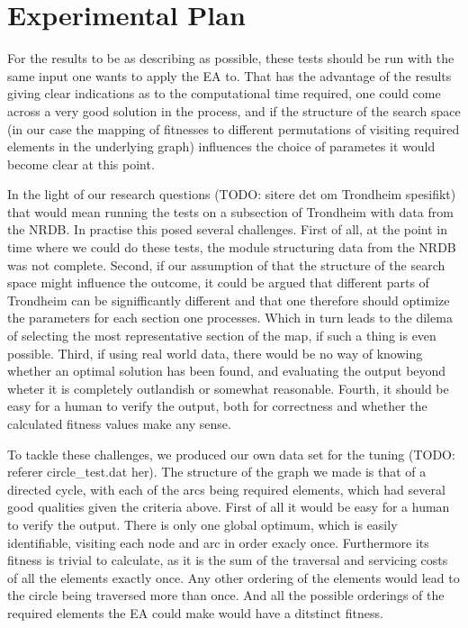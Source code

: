 \section{Experimental Plan} %
\label{sec:experimental_plan}
For the results to be as describing as possible, these tests should be run with the same input one wants to apply the EA to. That has the advantage of the results giving clear indications as to the computational time required, one could come across a very good solution in the process, and if the structure of the search space (in our case the mapping of fitnesses to different permutations of visiting required elements in the underlying graph) influences the choice of parametes it would become clear at this point.

In the light of our research questions (TODO: sitere det om Trondheim spesifikt) that would mean running the tests on a subsection of Trondheim with data from the NRDB. In practise this posed several challenges. First of all, at the point in time where we could do these tests, the module structuring data from the NRDB was not complete. Second, if our assumption of that the structure of the search space might influence the outcome, it could be argued that different parts of Trondheim can be signifficantly different and that one therefore should optimize the parameters for each section one processes. Which in turn leads to the dilema of selecting the most representative section of the map, if such a thing is even possible. Third, if using real world data, there would be no way of knowing whether an optimal solution has been found, and evaluating the output beyond wheter it is completely outlandish or somewhat reasonable. Fourth, it should be easy for a human to verify the output, both for correctness and whether the calculated fitness values make any sense.

To tackle these challenges, we produced our own data set for the tuning (TODO: referer circle\_test.dat her). The structure of the graph we made is that of a directed cycle, with each of the arcs being required elements, which had several good qualities given the criteria above. First of all it would be easy for a human to verify the output. There is only one global optimum, which is easily identifiable, visiting each node and arc in order exacly once. Furthermore its fitness is trivial to calculate, as it is the sum of the traversal and servicing costs of all the elements exactly once. Any other ordering of the elements would lead to the circle being traversed more than once. And all the possible orderings of the required elements the EA could make would have a ditstinct fitness.

